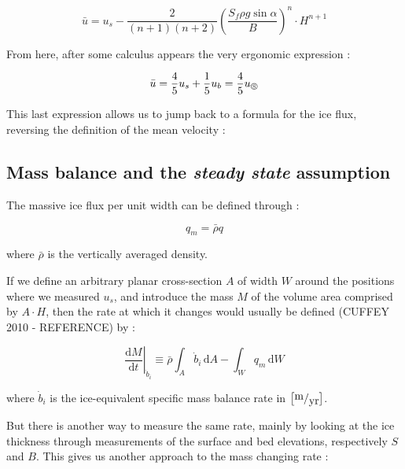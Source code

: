 \begin{equation}\bar{u} = u_s - \frac{2}{(n+1)(n+2)} \left( \frac{S_f \rho g \sin{\alpha}}{B}\right)^n \cdot H^{n+1}\end{equation}

From here, after some calculus appears the very ergonomic expression :

\begin{equation}\bar{u} = \frac{4}{5}u_s + \frac{1}{5}u_b = \frac{4}{5}u_\circledS\end{equation}

This last expression allows us to jump back to a formula for the ice flux, reversing the definition of the mean velocity :

\begin{center}
\end{center}


\subsection*{Mass balance and the \textit{steady state} assumption}

The massive ice flux per unit width can be defined through :

\begin{equation}q_m = \bar{\rho}q\end{equation}

where $\bar{\rho}$ is the vertically averaged density.

If we define an arbitrary planar cross-section $A$ of width $W$ around the positions where we measured $u_s$, and introduce the mass $M$ of the volume area comprised by $A \cdot H$, then the rate at which it changes would usually be defined (CUFFEY 2010 - REFERENCE) by :
 
\begin{equation}\left. \frac{\mathrm{d} M}{\mathrm{d}t} \right|_{\dot{b}_i} \equiv \bar{\rho} \int_A \dot{b}_i \, \mathrm{d}A - \int_W q_m \, \mathrm{d} W \end{equation}

where $\dot{b}_i$ is the ice-equivalent specific mass balance rate in $\left[ \fraction{m}{yr} \right]$.

But there is another way to measure the same rate, mainly by looking at the ice thickness through measurements of the surface and bed elevations, respectively $S$ and $B$. This gives us another approach to the mass changing rate :

